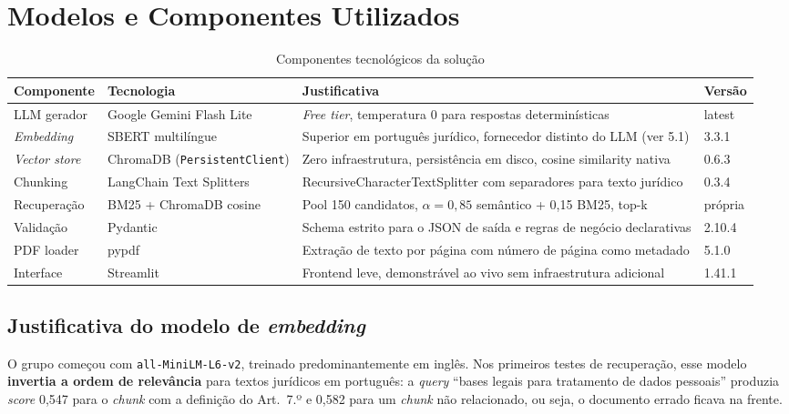 \documentclass[
  12pt,
  a4paper,
  brazil,
  article,
  oneside,
  sumario=tradicional
]{abntex2}
\begin{document}
\section{Modelos e Componentes Utilizados}
\label{sec:modelos}

\begin{table}[H]
\caption{Componentes tecnológicos da solução}
\label{tab:componentes}
\centering\small
\begin{tabularx}{\textwidth}{p{2.2cm}p{3.6cm}Xp{1.3cm}}
\toprule
\textbf{Componente} & \textbf{Tecnologia} & \textbf{Justificativa} & \textbf{Versão} \\
\midrule
LLM gerador      & Google Gemini Flash Lite       & \textit{Free tier}, temperatura 0 para respostas determinísticas & latest \\
\textit{Embedding} & SBERT multilíngue            & Superior em português jurídico, fornecedor distinto do LLM (ver 5.1) & 3.3.1 \\
\textit{Vector store} & ChromaDB (\texttt{PersistentClient}) & Zero infraestrutura, persistência em disco, cosine similarity nativa & 0.6.3 \\
Chunking         & LangChain Text Splitters       & RecursiveCharacterTextSplitter com separadores para texto jurídico & 0.3.4 \\
Recuperação      & BM25 + ChromaDB cosine         & Pool 150 candidatos, $\alpha{=}0{,}85$ semântico + 0,15 BM25, top-k & própria \\
Validação        & Pydantic                       & Schema estrito para o JSON de saída e regras de negócio declarativas & 2.10.4 \\
PDF loader       & pypdf                          & Extração de texto por página com número de página como metadado & 5.1.0 \\
Interface        & Streamlit                      & Frontend leve, demonstrável ao vivo sem infraestrutura adicional & 1.41.1 \\
\bottomrule
\end{tabularx}
\end{table}

\subsection{Justificativa do modelo de \textit{embedding}}
\label{ssec:emb}

O grupo começou com \texttt{all-MiniLM-L6-v2}, treinado predominantemente em inglês.
Nos primeiros testes de recuperação, esse modelo \textbf{invertia a ordem de
relevância} para textos jurídicos em português: a \textit{query} ``bases legais para
tratamento de dados pessoais'' produzia \textit{score} 0,547 para o \textit{chunk}
com a definição do Art.~7.º e 0,582 para um \textit{chunk} não relacionado, ou seja,
o documento errado ficava na frente.
\end{document}
